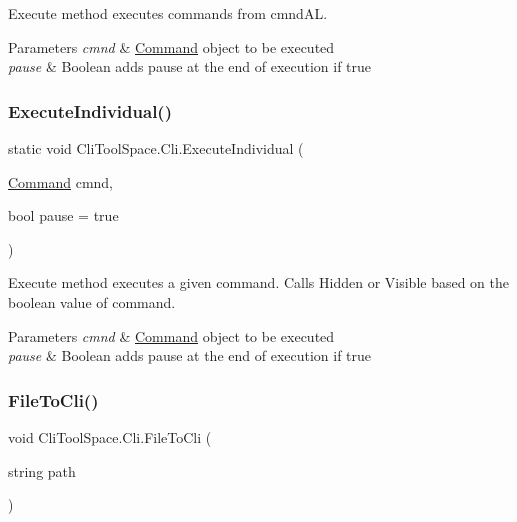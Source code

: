 Execute method executes commands from cmnd\+AL. 


\begin{DoxyParams}{Parameters}
{\em cmnd} & \mbox{\hyperlink{class_cli_tool_space_1_1_command}{Command}} object to be executed\\
\hline
{\em pause} & Boolean adds pause at the end of execution if true\\
\hline
\end{DoxyParams}
\mbox{\label{class_cli_tool_space_1_1_cli_a0e3c1975671466f8f2c8924c95f0b883}} 
\subsubsection{\texorpdfstring{ExecuteIndividual()}{ExecuteIndividual()}}
{\footnotesize\ttfamily static void Cli\+Tool\+Space.\+Cli.\+Execute\+Individual (\begin{DoxyParamCaption}\item[{\mbox{\hyperlink{class_cli_tool_space_1_1_command}{Command}}}]{cmnd,  }\item[{bool}]{pause = {\ttfamily true} }\end{DoxyParamCaption})\hspace{0.3cm}{\ttfamily [static]}}



Execute method executes a given command. Calls Hidden or Visible based on the boolean value of command. 


\begin{DoxyParams}{Parameters}
{\em cmnd} & \mbox{\hyperlink{class_cli_tool_space_1_1_command}{Command}} object to be executed\\
\hline
{\em pause} & Boolean adds pause at the end of execution if true\\
\hline
\end{DoxyParams}
\mbox{\label{class_cli_tool_space_1_1_cli_a8623bb3d3133538db1d87d42bda874f2}} 
\subsubsection{\texorpdfstring{FileToCli()}{FileToCli()}}
{\footnotesize\ttfamily void Cli\+Tool\+Space.\+Cli.\+File\+To\+Cli (\begin{DoxyParamCaption}\item[{string}]{path }\end{DoxyParamCaption})}



